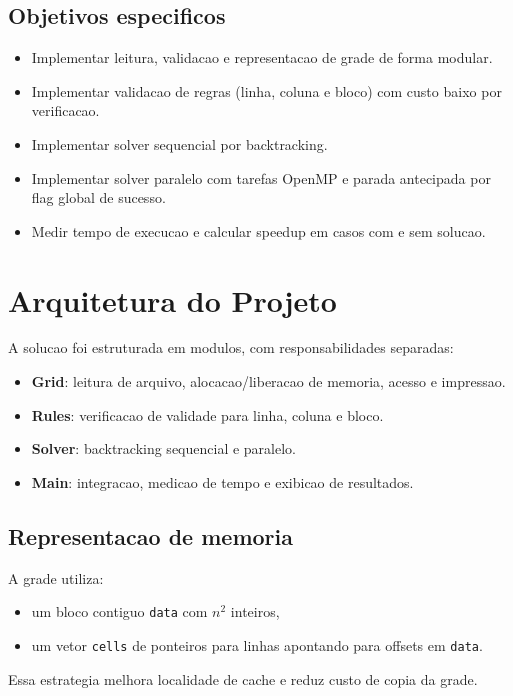 \documentclass[11pt,a4paper]{article}
\begin{document}
\subsection{Objetivos especificos}
\begin{itemize}
  \item Implementar leitura, validacao e representacao de grade de forma modular.
  \item Implementar validacao de regras (linha, coluna e bloco) com custo baixo por verificacao.
  \item Implementar solver sequencial por backtracking.
  \item Implementar solver paralelo com tarefas OpenMP e parada antecipada por flag global de sucesso.
  \item Medir tempo de execucao e calcular speedup em casos com e sem solucao.
\end{itemize}

\section{Arquitetura do Projeto}
A solucao foi estruturada em modulos, com responsabilidades separadas:

\begin{itemize}
  \item \textbf{Grid}: leitura de arquivo, alocacao/liberacao de memoria, acesso e impressao.
  \item \textbf{Rules}: verificacao de validade para linha, coluna e bloco.
  \item \textbf{Solver}: backtracking sequencial e paralelo.
  \item \textbf{Main}: integracao, medicao de tempo e exibicao de resultados.
\end{itemize}

\subsection{Representacao de memoria}
A grade utiliza:
\begin{itemize}
  \item um bloco contiguo \texttt{data} com \(n^2\) inteiros,
  \item um vetor \texttt{cells} de ponteiros para linhas apontando para offsets em \texttt{data}.
\end{itemize}

Essa estrategia melhora localidade de cache e reduz custo de copia da grade.
\end{document}
